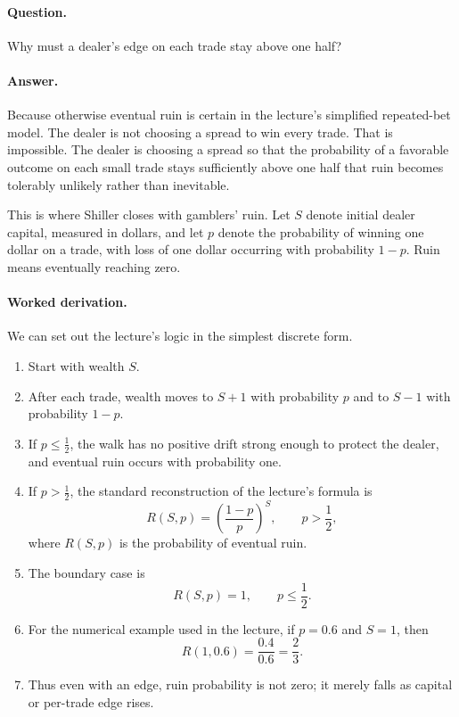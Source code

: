 \paragraph{Question.} Why must a dealer's edge on each trade stay above one half?

\paragraph{Answer.} Because otherwise eventual ruin is certain in the lecture's simplified repeated-bet model. The dealer is not choosing a spread to win every trade. That is impossible. The dealer is choosing a spread so that the probability of a favorable outcome on each small trade stays sufficiently above one half that ruin becomes tolerably unlikely rather than inevitable.

This is where Shiller closes with gamblers' ruin. Let \(S\) denote initial dealer capital, measured in dollars, and let \(p\) denote the probability of winning one dollar on a trade, with loss of one dollar occurring with probability \(1-p\). Ruin means eventually reaching zero.

\paragraph{Worked derivation.}
We can set out the lecture's logic in the simplest discrete form.
\begin{enumerate}
\item Start with wealth \(S\).
\item After each trade, wealth moves to \(S+1\) with probability \(p\) and to \(S-1\) with probability \(1-p\).
\item If \(p\le \tfrac12\), the walk has no positive drift strong enough to protect the dealer, and eventual ruin occurs with probability one.
\item If \(p>\tfrac12\), the standard reconstruction of the lecture's formula is
\begin{equation}
R(S,p)=\left(\frac{1-p}{p}\right)^S,
\qquad p>\frac12,
\end{equation}
where \(R(S,p)\) is the probability of eventual ruin.
\item The boundary case is
\begin{equation}
R(S,p)=1,
\qquad p\le \frac12.
\end{equation}
\item For the numerical example used in the lecture, if \(p=0.6\) and \(S=1\), then
\begin{equation}
R(1,0.6)=\frac{0.4}{0.6}=\frac23.
\end{equation}
\item Thus even with an edge, ruin probability is not zero; it merely falls as capital or per-trade edge rises.
\end{enumerate}

